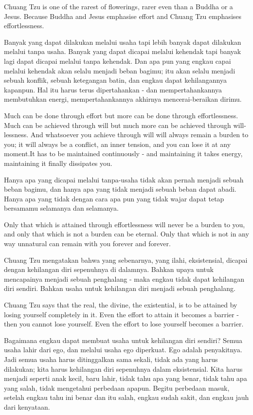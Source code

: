 \english
Chuang Tzu is one of the rarest of flowerings, rarer even than a Buddha or a Jesus. Because Buddha and Jesus emphasise effort and Chuang Tzu emphasises effortlessness.

\bahasa
Banyak yang dapat dilakukan melalui usaha tapi lebih banyak dapat dilakukan melalui tanpa usaha. Banyak yang dapat dicapai melalui kehendak tapi banyak lagi dapat dicapai melalui tanpa kehendak. Dan apa pun yang engkau capai melalui kehendak akan selalu menjadi beban bagimu; itu akan selalu menjadi sebuah konflik, sebuah ketegangan batin, dan engkau dapat kehilangannya kapanpun. Hal itu harus terus dipertahankan - dan mempertahankannya membutuhkan energi, mempertahankannya akhirnya mencerai-beraikan dirimu.

\english
Much can be done through effort but more can be done through effortlessness. Much can be achieved through will but much more can be achieved through will-lessness. And whatsoever you achieve through will will always remain a burden to you; it will always be a conflict, an inner tension, and you can lose it at any moment.It has to be maintained continuously - and maintaining it takes energy, maintaining it finally dissipates you.

\bahasa
Hanya apa yang dicapai melalui tanpa-usaha tidak akan pernah menjadi sebuah beban bagimu, dan hanya apa yang tidak menjadi sebuah beban dapat abadi. Hanya apa yang tidak dengan cara apa pun yang tidak wajar dapat tetap bersamamu selamanya dan selamanya.

\english
Only that which is attained through effortlessness will never be a burden to you, and only that which is not a burden can be eternal. Only that which is not in any way unnatural can remain with you forever and forever.

\bahasa
Chuang Tzu mengatakan bahwa yang sebenarnya, yang ilahi, eksistensial, dicapai dengan kehilangan diri sepenuhnya di dalamnya. Bahkan upaya untuk mencapainya menjadi sebuah penghalang - maka engkau tidak dapat kehilangan diri sendiri. Bahkan usaha untuk kehilangan diri menjadi sebuah penghalang.

\english
Chuang Tzu says that the real, the divine, the existential, is to be attained by losing yourself completely in it. Even the effort to attain it becomes a barrier - then you cannot lose yourself. Even the effort to lose yourself becomes a barrier.

\bahasa
Bagaimana engkau dapat membuat usaha untuk kehilangan diri sendiri? Semua usaha lahir dari ego, dan melalui usaha ego diperkuat. Ego adalah penyakitnya. Jadi semua usaha harus ditinggalkan sama sekali, tidak ada yang harus dilakukan; kita harus kehilangan diri sepenuhnya dalam eksistensial. Kita harus menjadi seperti anak kecil, baru lahir, tidak tahu apa yang benar, tidak tahu apa yang salah, tidak mengetahui perbedaan apapun. Begitu perbedaan masuk, setelah engkau tahu ini benar dan itu salah, engkau sudah sakit, dan engkau jauh dari kenyataan.

